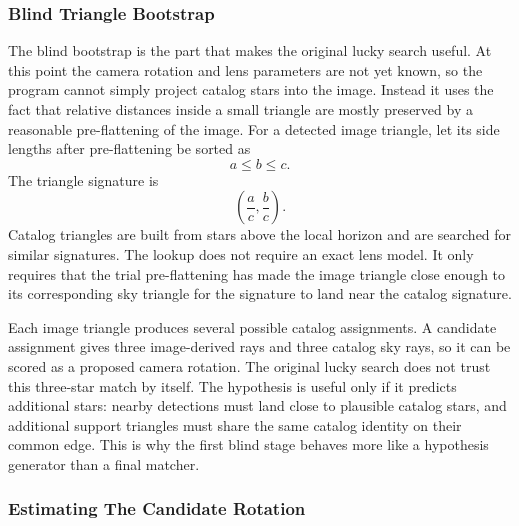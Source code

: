 \documentclass[11pt]{article}
\begin{document}
\subsubsection{Blind Triangle Bootstrap}

The blind bootstrap is the part that makes the original lucky search useful.
At this point the camera rotation and lens parameters are not yet known, so
the program cannot simply project catalog stars into the image. Instead it
uses the fact that relative distances inside a small triangle are mostly
preserved by a reasonable pre-flattening of the image. For a detected image
triangle, let its side lengths after pre-flattening be sorted as
\[
  a \le b \le c .
\]
The triangle signature is
\[
  \left(\frac{a}{c}, \frac{b}{c}\right).
\]
Catalog triangles are built from stars above the local horizon and are searched
for similar signatures. The lookup does not require an exact lens model. It
only requires that the trial pre-flattening has made the image triangle close
enough to its corresponding sky triangle for the signature to land near the
catalog signature.

Each image triangle produces several possible catalog assignments. A candidate
assignment gives three image-derived rays and three catalog sky rays, so it can
be scored as a proposed camera rotation. The original lucky search does not
trust this three-star match by itself. The hypothesis is useful only if it
predicts additional stars: nearby detections must land close to plausible
catalog stars, and additional support triangles must share the same catalog
identity on their common edge. This is why the first blind stage behaves more
like a hypothesis generator than a final matcher.

\subsubsection{Estimating The Candidate Rotation}
\end{document}
